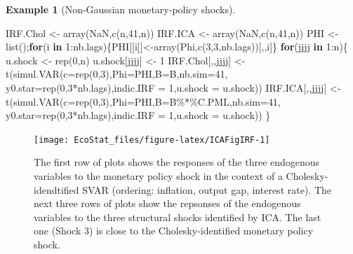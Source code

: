 \documentclass[
  12pt,
]{book}
\newenvironment{Shaded}{\begin{snugshade}}{\end{snugshade}}
\newcommand{\AttributeTok}[1]{\textcolor[rgb]{0.77,0.63,0.00}{#1}}
\newcommand{\ConstantTok}[1]{\textcolor[rgb]{0.00,0.00,0.00}{#1}}
\newcommand{\ControlFlowTok}[1]{\textcolor[rgb]{0.13,0.29,0.53}{\textbf{#1}}}
\newcommand{\DecValTok}[1]{\textcolor[rgb]{0.00,0.00,0.81}{#1}}
\newcommand{\FunctionTok}[1]{\textcolor[rgb]{0.00,0.00,0.00}{#1}}
\newcommand{\NormalTok}[1]{#1}
\newcommand{\OtherTok}[1]{\textcolor[rgb]{0.56,0.35,0.01}{#1}}
\newcommand{\SpecialCharTok}[1]{\textcolor[rgb]{0.00,0.00,0.00}{#1}}
\theoremstyle{definition}
\theoremstyle{definition}
\newtheorem{example}{Example}[chapter]
\theoremstyle{definition}
\theoremstyle{definition}
\theoremstyle{remark}
\begin{document}
\begin{example}[Non-Gaussian monetary-policy shocks]
\begin{Shaded}
\begin{Highlighting}[]
\NormalTok{IRF.Chol }\OtherTok{\textless{}{-}} \FunctionTok{array}\NormalTok{(}\ConstantTok{NaN}\NormalTok{,}\FunctionTok{c}\NormalTok{(n,}\DecValTok{41}\NormalTok{,n))}
\NormalTok{IRF.ICA  }\OtherTok{\textless{}{-}} \FunctionTok{array}\NormalTok{(}\ConstantTok{NaN}\NormalTok{,}\FunctionTok{c}\NormalTok{(n,}\DecValTok{41}\NormalTok{,n))}
\NormalTok{PHI }\OtherTok{\textless{}{-}} \FunctionTok{list}\NormalTok{();}\ControlFlowTok{for}\NormalTok{(i }\ControlFlowTok{in} \DecValTok{1}\SpecialCharTok{:}\NormalTok{nb.lags)\{PHI[[i]]}\OtherTok{\textless{}{-}}\FunctionTok{array}\NormalTok{(Phi,}\FunctionTok{c}\NormalTok{(}\DecValTok{3}\NormalTok{,}\DecValTok{3}\NormalTok{,nb.lags))[,,i]\}}
\ControlFlowTok{for}\NormalTok{(jjjj }\ControlFlowTok{in} \DecValTok{1}\SpecialCharTok{:}\NormalTok{n)\{}
\NormalTok{  u.shock }\OtherTok{\textless{}{-}} \FunctionTok{rep}\NormalTok{(}\DecValTok{0}\NormalTok{,n)}
\NormalTok{  u.shock[jjjj] }\OtherTok{\textless{}{-}} \DecValTok{1}
\NormalTok{  IRF.Chol[,,jjjj] }\OtherTok{\textless{}{-}} 
    \FunctionTok{t}\NormalTok{(}\FunctionTok{simul.VAR}\NormalTok{(}\AttributeTok{c=}\FunctionTok{rep}\NormalTok{(}\DecValTok{0}\NormalTok{,}\DecValTok{3}\NormalTok{),}\AttributeTok{Phi=}\NormalTok{PHI,}\AttributeTok{B=}\NormalTok{B,}\AttributeTok{nb.sim=}\DecValTok{41}\NormalTok{,}
                \AttributeTok{y0.star=}\FunctionTok{rep}\NormalTok{(}\DecValTok{0}\NormalTok{,}\DecValTok{3}\SpecialCharTok{*}\NormalTok{nb.lags),}\AttributeTok{indic.IRF =} \DecValTok{1}\NormalTok{,}\AttributeTok{u.shock =}\NormalTok{ u.shock))}
\NormalTok{  IRF.ICA[,,jjjj]  }\OtherTok{\textless{}{-}} 
    \FunctionTok{t}\NormalTok{(}\FunctionTok{simul.VAR}\NormalTok{(}\AttributeTok{c=}\FunctionTok{rep}\NormalTok{(}\DecValTok{0}\NormalTok{,}\DecValTok{3}\NormalTok{),}\AttributeTok{Phi=}\NormalTok{PHI,}\AttributeTok{B=}\NormalTok{B}\SpecialCharTok{\%*\%}\NormalTok{C.PML,}\AttributeTok{nb.sim=}\DecValTok{41}\NormalTok{,}
                \AttributeTok{y0.star=}\FunctionTok{rep}\NormalTok{(}\DecValTok{0}\NormalTok{,}\DecValTok{3}\SpecialCharTok{*}\NormalTok{nb.lags),}\AttributeTok{indic.IRF =} \DecValTok{1}\NormalTok{,}\AttributeTok{u.shock =}\NormalTok{ u.shock))}
\NormalTok{\}}
\end{Highlighting}
\end{Shaded}

\begin{figure}
\texttt{[image: EcoStat\_files/figure-latex/ICAFigIRF-1]} \caption{The first row of plots shows the responses of the three endogenous variables to the monetary policy shock in the context of a Cholesky-idendtified SVAR (ordering: inflation, output gap, interest rate). The next three rows of plots show the repsonses of the endogenous variables to the three structural shocks identified by ICA. The last one (Shock 3) is close to the Cholesky-identified monetary policy shock.}\label{fig:ICAFigIRF}
\end{figure}


\end{example}
\end{document}

